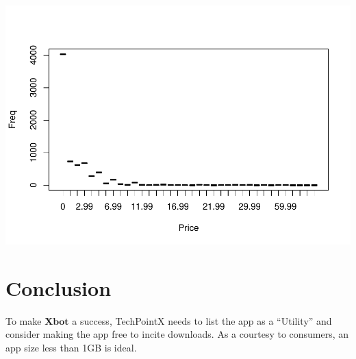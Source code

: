 \documentclass[]{article}
\begin{document}
\includegraphics{xtern_ds_report_files/figure-latex/analysis6-1.pdf}

\hypertarget{conclusion}{%
\section{Conclusion}\label{conclusion}}

To make \(\textbf{Xbot}\) a success, TechPointX needs to list the app as
a ``Utility'' and consider making the app free to incite downloads. As a
courtesy to consumers, an app size less than 1GB is ideal.
\end{document}
